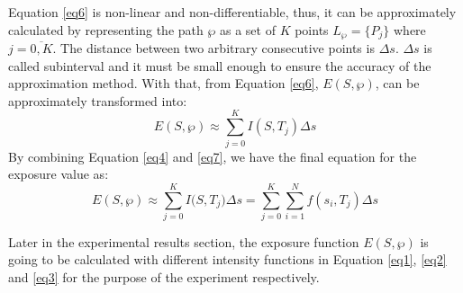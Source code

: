 \documentclass[final]{elsarticle}
\begin{document}
Equation \eqref{eq6} is non-linear and non-differentiable, thus,
it can be approximately calculated by representing the path $\wp $ as a set
of $ K $ points ${L_\wp } = \{ {P_j}\} $ where $j = \overline {0,K} $. The distance between two arbitrary consecutive points is $\Delta s$. $\Delta s$ is called subinterval and it must be small enough to ensure the accuracy of the approximation method. With that, from Equation \eqref{eq6}, $ E(S,\wp ) $, can be approximately transformed into:
\begin{equation}
\label{eq7}
E(S,\wp) \approx \sum\limits_{j = 0}^K {I(S, T_j)\Delta s} 
\end{equation}
By combining Equation \eqref{eq4} and \eqref{eq7}, we have the final equation for the exposure value as:
\begin{equation}
\label{eq8}
E(S,\wp ) \approx \sum\limits_{j = 0}^K {I(S,{T_j}} )\Delta s = \sum\limits_{j = 0}^K {\sum\limits_{i = 1}^N {f({s_i},{T_j})} } \Delta s
\end{equation}

Later in the experimental results section, the exposure function $ E(S,\wp )$ is going to be calculated with different intensity functions in Equation \eqref{eq1}, \eqref{eq2} and \eqref{eq3} for the purpose of the experiment respectively. 
\end{document}
